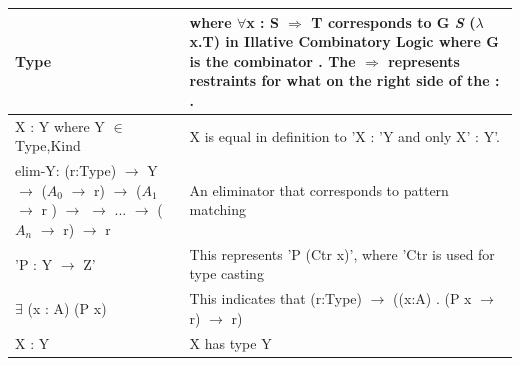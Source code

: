 \documentclass[12pt]{report}
\begin{document}
\begin{longtable}{|m{5cm}|m{9cm}| }
          Type    &  where $\forall$x : S $\Rightarrow$ T corresponds to 
          $\mathbf{G}$ \textit{S} ($\lambda$x.T) in Illative Combinatory 
          Logic 
          where G is the combinator \cite{CombLogic}. The $\Rightarrow$ 
          represents restraints for what on the right side of the : .\\ 
        \hline
        X : Y  where Y $\in$ {Type,Kind} &  X is equal in definition to 'X : 'Y 
        and only X' : Y'. \\ 
        \hline
        elim-Y: (r:Type) $\rightarrow$ Y $\rightarrow$ ($A_0$ $\rightarrow$ r) 
        $\rightarrow$ ($A_1$ $\rightarrow$ r ) $\rightarrow$ $\rightarrow$ 
        $...$ $\rightarrow$ ($A_n$ $\rightarrow$ r) $\rightarrow$ r   &  An 
        eliminator that corresponds to pattern matching \\ 
        \hline
        'P : Y $\rightarrow$ Z'   &  This represents 'P (Ctr x)', where 'Ctr  
        is used for type casting\\ 
        \hline
         $\exists$ (x : A) (P x) & This indicates that (r:Type) $\rightarrow$ 
         ((x:A) . (P x $\rightarrow$ r) $\rightarrow$ r) \\ 
        \hline
        X : Y   &  X has type Y \\ 
        \hline
        
\end{longtable}
\end{document}
